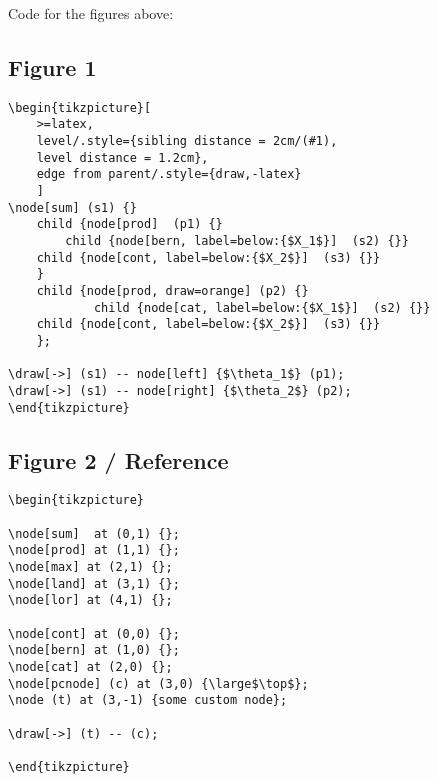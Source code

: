 \documentclass[11pt]{article}
\begin{document}
Code for the figures above:
\subsection*{Figure 1}
\begin{verbatim}
\begin{tikzpicture}[
	>=latex,
	level/.style={sibling distance = 2cm/(#1), 
	level distance = 1.2cm},
	edge from parent/.style={draw,-latex}
	]
\node[sum] (s1) {}
    child {node[prod]  (p1) {}
    	child {node[bern, label=below:{$X_1$}]  (s2) {}}
	child {node[cont, label=below:{$X_2$}]  (s3) {}}
    }
    child {node[prod, draw=orange] (p2) {}
        	child {node[cat, label=below:{$X_1$}]  (s2) {}}
	child {node[cont, label=below:{$X_2$}]  (s3) {}}
    };
    
\draw[->] (s1) -- node[left] {$\theta_1$} (p1);
\draw[->] (s1) -- node[right] {$\theta_2$} (p2);
\end{tikzpicture}
\end{verbatim}

\subsection*{Figure 2 / Reference}
\begin{verbatim}
\begin{tikzpicture}

\node[sum]  at (0,1) {};
\node[prod] at (1,1) {};
\node[max] at (2,1) {};
\node[land] at (3,1) {};
\node[lor] at (4,1) {};

\node[cont] at (0,0) {};
\node[bern] at (1,0) {};
\node[cat] at (2,0) {};
\node[pcnode] (c) at (3,0) {\large$\top$};
\node (t) at (3,-1) {some custom node};

\draw[->] (t) -- (c);

\end{tikzpicture}
\end{verbatim}
\end{document}
